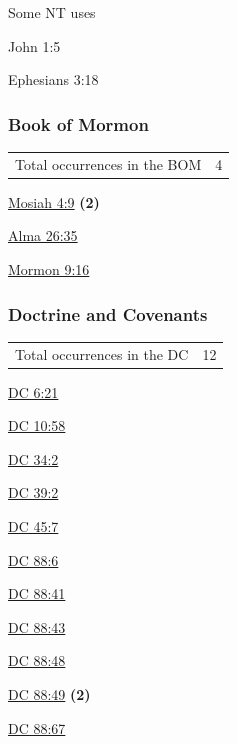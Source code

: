 				\begin{compactdesc}
					\item[Some NT uses] \textbf{}
						\begin{compactdesc}
							\item[John 1:5]
							\item[Ephesians 3:18]
						\end{compactdesc}
				\end{compactdesc}
		
	\subsubsection{Book of Mormon} %
		\label{COMPREHEND-BOM}
	
		\begin{tabular}{ll}
			Total occurrences in the BOM & 4
		\end{tabular}
		
		\begin{compactdesc}
			\item[{\hyperref[MOSIAH-4-9]{Mosiah 4:9}}] \textbf{(2)}
			\item[{\hyperref[ALMA-26-35]{Alma 26:35}}]
			\item[{\hyperref[MORMON-9-16]{Mormon 9:16}}]
		\end{compactdesc}
		
	\subsubsection{Doctrine and Covenants} %
		\label{COMPREHEND-DC}
	
		\begin{tabular}{ll}
			Total occurrences in the DC & 12
		\end{tabular}
		
		\begin{compactdesc}
			\item[{\hyperref[DC6-21]{DC 6:21}}]
			\item[{\hyperref[DC10-58]{DC 10:58}}]
			\item[{\hyperref[DC34-2]{DC 34:2}}]
			\item[{\hyperref[DC39-2]{DC 39:2}}]
			\item[{\hyperref[DC45-7]{DC 45:7}}]
			\item[{\hyperref[DC88-6]{DC 88:6}}]
			\item[{\hyperref[DC88-41]{DC 88:41}}]
			\item[{\hyperref[DC88-43]{DC 88:43}}]
			\item[{\hyperref[DC88-48]{DC 88:48}}]
			\item[{\hyperref[DC88-49]{DC 88:49}}] \textbf{(2)}
			\item[{\hyperref[DC88-67]{DC 88:67}}]
		\end{compactdesc}
		
